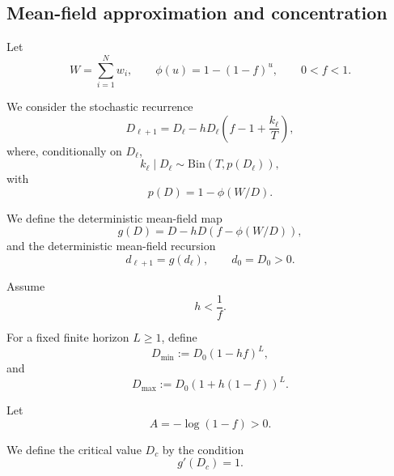 \documentclass[10pt]{iopart}
\newcommand{\1}{\mathbf{1}}
\begin{document}
\subsection{Mean-field approximation and concentration\label{sec:concentration}}
%
Let
\begin{equation}
W=\sum_{i=1}^N w_i,
\qquad
\phi(u)=1-(1-f)^u,
\qquad
0<f<1.
\label{eq:phi_def}
\end{equation}

We consider the stochastic recurrence
\begin{equation}
D_{\ell+1}
=
D_\ell-hD_\ell
\left(
f-1+\frac{k_\ell}{T}
\right),
\label{eq:stochastic_recursion}
\end{equation}
where, conditionally on $D_\ell$,
\begin{equation}
k_\ell\mid D_\ell
\sim
\mathrm{Bin}(T,p(D_\ell)),
\label{eq:binomial_model}
\end{equation}
with
\begin{equation}
p(D)=1-\phi(W/D).
\label{eq:p_def}
\end{equation}

We define the deterministic mean-field map
\begin{equation}
g(D)
=
D-hD(f-\phi(W/D)),
\label{eq:g_def}
\end{equation}
and the deterministic mean-field recursion
\begin{equation}
d_{\ell+1}=g(d_\ell),
\qquad
d_0=D_0>0.
\label{eq:mean_field_recursion}
\end{equation}

Assume
\begin{equation}
h<\frac1f.
\label{eq:h_condition}
\end{equation}

For a fixed finite horizon $L\ge1$, define
\begin{equation}
D_{\min}
:=
D_0(1-hf)^L,
\label{eq:Dmin_def}
\end{equation}
and
\begin{equation}
D_{\max}
:=
D_0(1+h(1-f))^L.
\label{eq:Dmax_def}
\end{equation}

Let
\begin{equation}
A=-\log(1-f)>0.
\label{eq:c_def}
\end{equation}

We define the critical value $D_c$ by the condition
\begin{equation}
g'(D_c)=1.
\label{eq:Dc_definition}
\end{equation}
\end{document}
